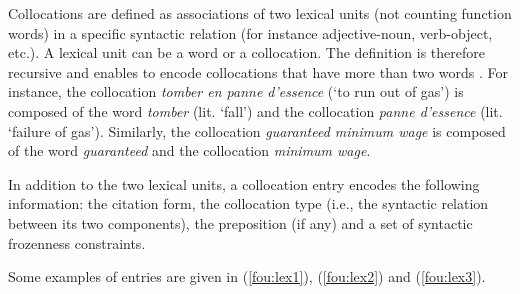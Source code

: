 \documentclass[output=paper]{langsci/langscibook}
\begin{document}

Collocations are defined as associations of two lexical units (not counting function words) in a specific syntactic relation (for instance adjective-noun, verb-object, etc.). 
A lexical unit can be a word or a collocation. The definition is therefore recursive and enables to encode collocations that have more than two words \citep{nws10}. 
For instance, the  collocation \textit{tomber en panne d’essence} (`to run out of gas') is composed of the word \textit{tomber} (lit. `fall') and the collocation \textit{panne d'essence} (lit. `failure of gas'). Similarly, the  collocation 
\textit{guaranteed minimum wage} is composed of the word \textit{guaranteed} and the collocation \textit{minimum wage}.

In addition to the two lexical units, a collocation entry encodes the following information: 
the citation form, the collocation type (i.e., the syntactic relation between its two components), the preposition (if any) and a set of syntactic frozenness constraints. 

Some examples of  entries are given in (\ref{fou:lex1}), (\ref{fou:lex2}) and (\ref{fou:lex3}). %

\end{document}

